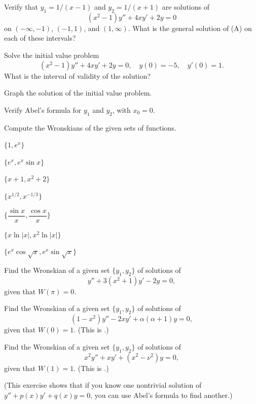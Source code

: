 \begin{exerciselist}
\item\label{exer:5.1.4}\begin{alist}
\item %
Verify that $y_1=1/(x-1)$ and $y_2=1/(x+1)$ are solutions of
\[
(x^2-1)y''+4xy'+2y=0\tag{A}
\]
on  $(-\infty,-1)$, $(-1,1)$, and $(1,\infty)$.
What is the general solution of (A) on each of
these intervals?
\item %
Solve the initial value problem
\[
(x^2-1)y''+4xy'+2y=0,\quad  y(0)=-5,\quad y'(0)=1.
\]
What is the interval of validity of the solution?
\item %
\CGex Graph the solution of the initial value problem.
\item %
Verify Abel's formula for $y_1$ and $y_2$, with $x_0=0$.
\end{alist}

\item\label{exer:5.1.5}Compute the Wronskians of the given sets of functions.
%
\begin{alist*}[columns=2]
\item $\{1, e^x\}$
\item $\{e^x, e^x \sin x\}$
\item $\{x+1,  x^2+2\}$
\item $\{ x^{1/2},  x^{-1/3}\}$
\item $\{\dfrac{\sin x}{x},  \dfrac{\cos x}{x}\}$
\item $\{ x \ln|x|, x^2\ln|x|\}$
\item $\{e^x\cos\sqrt x, e^x\sin\sqrt x\}$
\end{alist*}

\item\label{exer:5.1.6}Find the Wronskian  of a given set $\{y_1,y_2\}$ of solutions of
\[
y''+3(x^2+1)y'-2y=0,
\]
given that $W(\pi)=0$.

\item\label{exer:5.1.7}Find the Wronskian of a given set $\{y_1,y_2\}$ of solutions of
\[
(1-x^2)y''-2xy'+\alpha(\alpha+1)y=0,
\]
given that $W(0)=1$.  (This is
.)

\item\label{exer:5.1.8}Find the Wronskian of a given set $\{y_1,y_2\}$ of solutions of
\[
x^2y''+xy'+(x^2-\nu^2)y=0 ,
\]
given that $W(1)=1$.  (This is
.)

\item\label{exer:5.1.9}%
(This exercise shows  that if you know one
nontrivial solution of $y''+p(x)y'+q(x)y=0$, you can use Abel's
formula to find another.)


\end{exerciselist}
